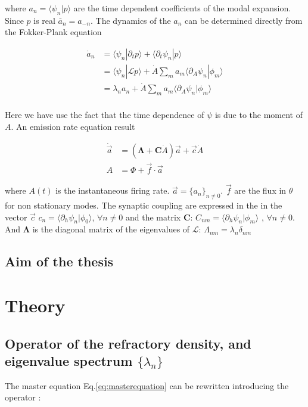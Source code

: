 \documentclass[12pt,twoside]{report}
\begin{document}
where $a_n=\langle \psi_n | p\rangle$ are the time dependent coefficients of the modal expansion. Since $p$ is real $\bar{a}_n=a_{-n}$. The dynamics of the $a_n$ can be determined directly from the Fokker-Plank equation

\begin{align}
\dot{a}_n&=\langle\psi_n|\partial_t p\rangle+\langle\partial_t\psi_n|p\rangle \nonumber \\
&=\langle\psi_n|\mathcal{L}p\rangle+  \dot{A}\sum_ma_m\langle\partial_A\psi_n|\phi_m \rangle \nonumber \\
&=\lambda_n a_n +  \dot{A}\sum_ma_m\langle\partial_A\psi_n|\phi_m \rangle \nonumber \\
\end{align}

Here we have use the fact that the time dependence of $\psi$ is due to the moment of $A$. An emission rate equation result

\begin{align}
\dot{\vec{a}}&=(\boldsymbol{\Lambda}+\boldsymbol{C}\dot{A})\vec{a}+\vec{c}\dot{A}\nonumber\\
A&=\Phi+\vec{f}\cdot\vec{a}
\end{align}

where $A(t)$ is the instantaneous firing rate. $\vec{a}=\{a_n\}_{n \neq 0}$. $\vec{f}$ are the flux in $\theta$ for non stationary modes. The synaptic coupling are expressed in the in the vector $\vec{c}$ $c_n=\langle\partial_h\psi_n|\phi_0\rangle$, $\forall n \neq 0$ and the matrix $\boldsymbol{C}$: $C_{nm}=\langle\partial_h\psi_n|\phi_m\rangle$ , $\forall n \neq 0$. And $\boldsymbol{\Lambda}$ is the diagonal matrix of the eigenvalues of $\mathcal{L}$: $\Lambda_{nm}=\lambda_n\delta_{nm}$


\section{Aim of the thesis}



\chapter{Theory}
\label{sec:theory}
\section{Operator of the refractory density, and eigenvalue spectrum $\{\lambda_n\}$}

The master equation Eq.\eqref{eq:masterequation} can be rewritten introducing the operator :
\end{document}
